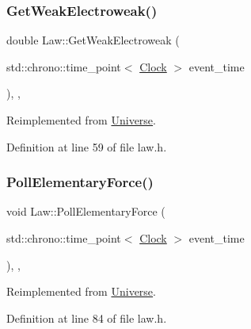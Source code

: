 \subsubsection{\texorpdfstring{Get\+Weak\+Electroweak()}{GetWeakElectroweak()}}
{\footnotesize\ttfamily double Law\+::\+Get\+Weak\+Electroweak (\begin{DoxyParamCaption}\item[{std\+::chrono\+::time\+\_\+point$<$ \hyperlink{universe_8h_a0ef8d951d1ca5ab3cfaf7ab4c7a6fd80}{Clock} $>$}]{event\+\_\+time }\end{DoxyParamCaption})\hspace{0.3cm}{\ttfamily [inline]}, {\ttfamily [final]}, {\ttfamily [virtual]}}



Reimplemented from \hyperlink{class_universe_a645299738e6b798a037f2a15a2e7cf4d}{Universe}.



Definition at line 59 of file law.\+h.

\mbox{\label{class_law_af99520c95b2cd8af0af110b78b2288ef}} 
\subsubsection{\texorpdfstring{Poll\+Elementary\+Force()}{PollElementaryForce()}}
{\footnotesize\ttfamily void Law\+::\+Poll\+Elementary\+Force (\begin{DoxyParamCaption}\item[{std\+::chrono\+::time\+\_\+point$<$ \hyperlink{universe_8h_a0ef8d951d1ca5ab3cfaf7ab4c7a6fd80}{Clock} $>$}]{event\+\_\+time }\end{DoxyParamCaption})\hspace{0.3cm}{\ttfamily [inline]}, {\ttfamily [final]}, {\ttfamily [virtual]}}



Reimplemented from \hyperlink{class_universe_a0c485c504542409cbb5cfd8543c35b11}{Universe}.



Definition at line 84 of file law.\+h.

\mbox{\label{class_law_a56541ec0b82b8a7c377ae2e6b444205c}} 
